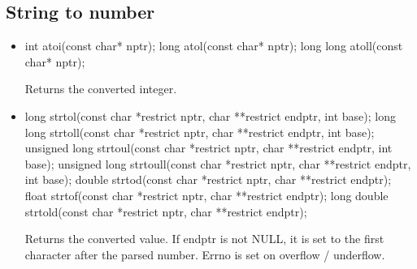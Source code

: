 \documentclass{report}
\begin{document}
    \pagebreak 
    \subsection{String to number}
    \begin{itemize}
        \item 
            \bigbreak \noindent 
            \begin{cppcode}
                int atoi(const char* nptr);
                long atol(const char* nptr);
                long long atoll(const char* nptr);
            \end{cppcode}
            \bigbreak \noindent 
            Returns the converted integer.
        \item
            \bigbreak \noindent 
            \begin{cppcode}
                long strtol(const char *restrict nptr, char **restrict endptr, int base);
                long long strtoll(const char *restrict nptr, char **restrict endptr, int base);
                unsigned long strtoul(const char *restrict nptr, char **restrict endptr, int base);
                unsigned long strtoull(const char *restrict nptr, char **restrict endptr, int base);
                double strtod(const char *restrict nptr, char **restrict endptr);
                float strtof(const char *restrict nptr, char **restrict endptr);
                long double strtold(const char *restrict nptr, char **restrict endptr);
            \end{cppcode}
            \bigbreak \noindent 
            Returns the converted value. If endptr is not NULL, it is set to the first character after the parsed number.
            \bigbreak \noindent 
            Errno is set on overflow / underflow.


    \end{itemize}

    \pagebreak 
\end{document}
